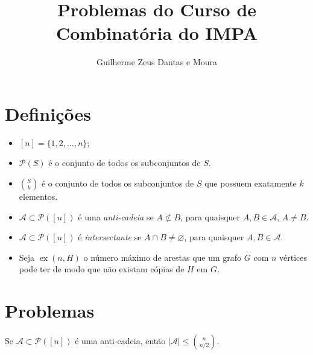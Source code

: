 \documentclass[10pt,a4paper]{article}
\title{Problemas do Curso de Combinatória do IMPA}
\author{Guilherme Zeus Dantas e Moura}
\DeclareMathOperator\ex{ex}
\begin{document}
	
	\zeustitle

	\section*{\textsf{Definições}}

	\begin{itemize}
		\item $[n] = \{1, 2, \dots, n\}$;
		\item $\mathcal{P}(S)$ é o conjunto de todos os subconjuntos de $S$.
		\item $\binom{S}{k}$ é o conjunto de todos os subconjuntos de $S$ que possuem exatamente $k$ elementos.
		\item $\mathcal{A} \subset \mathcal{P}([n])$ é uma \emph{anti-cadeia} se $A \not\subset B$, para quaisquer $A, B \in \mathcal{A}$, $A \neq B$.
		\item $\mathcal{A} \subset \mathcal{P}([n])$ é \emph{intersectante} se $A \cap B \neq \varnothing$, para quaisquer  $A, B \in \mathcal{A}$.
		\item Seja $\ex(n, H)$ o número máximo de arestas que um grafo $G$ com $n$ vértices pode ter de modo que não existam cópias de $H$ em $G$.
	\end{itemize}

	\section*{\textsf{Problemas}}


\begin{prob}%
	Se $\mathcal A \subset \mathcal P([n])$ é uma anti-cadeia, então $|\mathcal A| \le \binom{n}{n/2}$.
\end{prob}



\end{document}
